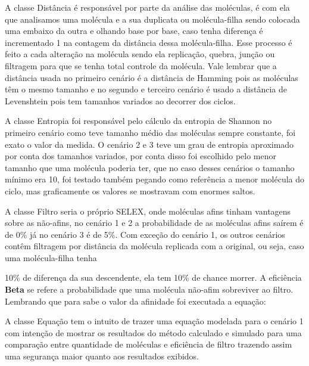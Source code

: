 A classe Distância é responsável por parte da análise das moléculas, é com ela que
analisamos uma molécula e a sua duplicata ou molécula-filha sendo colocada uma
embaixo da outra e olhando base por base, caso tenha diferença é incrementado 1 na
contagem da distância dessa molécula-filha. Esse processo é feito a cada alteração na
molécula sendo ela replicação, quebra, junção ou filtragem para que se tenha total
controle da molécula. Vale lembrar que a distância usada no primeiro cenário é a distância
de Hamming pois as moléculas têm o mesmo tamanho e no segundo e terceiro cenário é
usado a distância de Levenshtein pois tem tamanhos variados ao decorrer dos ciclos.

A classe Entropia foi responsável pelo cálculo da entropia de Shannon no
primeiro cenário como teve tamanho médio das moléculas sempre constante, foi exato o
valor da medida. O cenário 2 e 3 teve um grau de entropia aproximado por conta dos
tamanhos variados, por conta disso foi escolhido pelo menor tamanho que uma molécula
poderia ter, que no caso desses cenários o tamanho mínimo era 10, foi testado também
pegando como referência a menor molécula do ciclo, mas graficamente os valores se
mostravam com enormes saltos.

A classe Filtro seria o próprio SELEX, onde moléculas afins tinham vantagens
sobre as não-afins, no cenário 1 e 2 a probabilidade de as moléculas afins saírem é de 0\%
já no cenário 3 é de 5\%. Com exceção do cenário 1, os outros cenários contêm filtragem
por distância da molécula replicada com a original, ou seja, caso uma molécula-filha tenha

10\% de diferença da sua descendente, ela tem 10\% de chance morrer. A eficiência \textbf{Beta}
se refere a probabilidade que uma molécula não-afim sobreviver ao filtro. Lembrando que
para sabe o valor da afinidade foi executada a equação:


A classe Equação tem o intuito de trazer uma equação modelada para o cenário 1
com intenção de mostrar os resultados do método calculado e simulado para uma
comparação entre quantidade de moléculas e eficiência de filtro trazendo assim uma
segurança maior quanto aos resultados exibidos.

